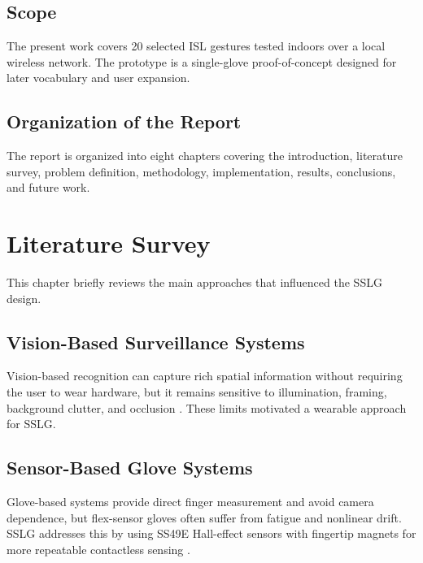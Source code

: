\documentclass[12pt,a4paper]{report}
\begin{document}
\section{Scope}
\label{sec:intro_scope}

The present work covers 20 selected ISL gestures tested indoors over a local wireless network. The prototype is a single-glove proof-of-concept designed for later vocabulary and user expansion.

\section{Organization of the Report}
\label{sec:intro_organization}

The report is organized into eight chapters covering the introduction, literature survey, problem definition, methodology, implementation, results, conclusions, and future work.


\chapter{Literature Survey}

This chapter briefly reviews the main approaches that influenced the SSLG design.

\section{Vision-Based Surveillance Systems}
\label{sec:lit_vision}

Vision-based recognition can capture rich spatial information without requiring the user to wear hardware, but it remains sensitive to illumination, framing, background clutter, and occlusion \cite{mitra}. These limits motivated a wearable approach for SSLG.

\section{Sensor-Based Glove Systems}
\label{sec:lit_glove_systems}

Glove-based systems provide direct finger measurement and avoid camera dependence, but flex-sensor gloves often suffer from fatigue and nonlinear drift. SSLG addresses this by using SS49E Hall-effect sensors with fingertip magnets for more repeatable contactless sensing \cite{ss49e}.
\end{document}
